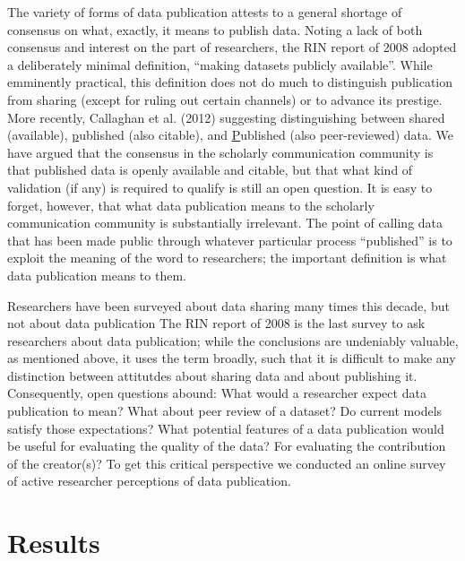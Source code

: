 \documentclass[10pt]{article}
\begin{document}
The variety of forms of data publication attests to a general shortage of consensus on what, exactly, it means to publish data.
Noting a lack of both consensus and interest on the part of researchers, the RIN report of 2008 adopted a deliberately minimal definition, ``making datasets publicly available''\cite{swan_share_2008}.
While emminently practical, this definition does not do much to distinguish publication from sharing (except for ruling out certain channels) or to advance its prestige.
More recently, Callaghan et al. (2012) suggesting distinguishing between shared (available), \underline{p}ublished (also citable), and \underline{P}ublished (also peer-reviewed) data\cite{callaghan_making_2012}.
We have argued that the consensus in the scholarly communication community is that published data is openly available and citable, but that what kind of validation (if any) is required to qualify is still an open question\cite{kratz_data_2014}.
It is easy to forget, however, that what data publication means to the scholarly communication community is substantially irrelevant.
The point of calling data that has been made public through whatever particular process ``published'' is to exploit the meaning of the word to researchers; the important definition is what data publication means to them. 

Researchers have been surveyed about data sharing many times this decade, but not about data publication\cite{harley_assessing_2010, westra_data_2010, tenopir_data_2011, kim_institutional_2012, scaramozzino_study_2012, williams_gathering_2013, bobrow_establishing_2014, strasser_dataup_2014}
The RIN report of 2008 is the last survey to ask researchers about data publication; while the conclusions are undeniably valuable, as mentioned above, it uses the term broadly, such that it is difficult to make any distinction between attitutdes about sharing data and about publishing it\cite{swan_share_2008}.
Consequently, open questions abound:
What would a researcher expect data publication to mean?
What about peer review of a dataset?
Do current models satisfy those expectations?
What potential features of a data publication would be useful for evaluating the quality of the data?
For evaluating the contribution of the creator(s)?
To get this critical perspective we conducted an online survey of active researcher perceptions of data publication.


\section*{Results}
\end{document}
